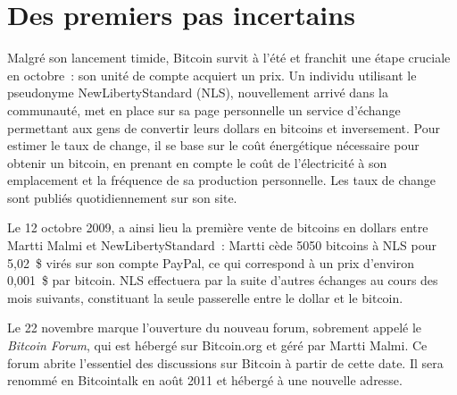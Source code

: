 
\section*{Des premiers pas incertains}

Malgré son lancement timide, Bitcoin survit à l'été et franchit une étape cruciale en octobre~: son unité de compte acquiert un prix. Un individu utilisant le pseudonyme NewLibertyStandard (NLS), nouvellement arrivé dans la communauté, met en place sur sa page personnelle un service d'échange permettant aux gens de convertir leurs dollars en bitcoins et inversement. Pour estimer le taux de change, il se base sur le coût énergétique nécessaire pour obtenir un bitcoin, en prenant en compte le coût de l'électricité à son emplacement et la fréquence de sa production personnelle. Les taux de change sont publiés quotidiennement sur son site.

Le 12 octobre 2009, a ainsi lieu la première vente de bitcoins en dollars entre Martti Malmi et NewLibertyStandard~: Martti cède 5050 bitcoins à NLS pour 5,02~\$ virés sur son compte PayPal, ce qui correspond à un prix d'environ 0,001~\$ par bitcoin. NLS effectuera par la suite d'autres échanges au cours des mois suivants, constituant la seule passerelle entre le dollar et le bitcoin. %

Le 22 novembre marque l'ouverture du nouveau forum, sobrement appelé le \emph{Bitcoin Forum}, qui est hébergé sur Bitcoin.org et géré par Martti Malmi. Ce forum abrite l'essentiel des discussions sur Bitcoin à partir de cette date. Il sera renommé en Bitcointalk en août 2011 et hébergé à une nouvelle adresse.

